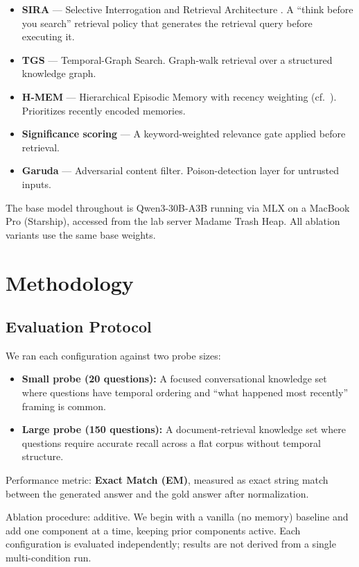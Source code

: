 \documentclass[11pt,a4paper]{article}
\begin{document}
\begin{itemize}
  \item \textbf{SIRA} --- Selective Interrogation and Retrieval Architecture \cite{sira}. A ``think before you search'' retrieval policy that generates the retrieval query before executing it.
  \item \textbf{TGS} --- Temporal-Graph Search. Graph-walk retrieval over a structured knowledge graph.
  \item \textbf{H-MEM} --- Hierarchical Episodic Memory with recency weighting (cf.~\cite{hipporag}). Prioritizes recently encoded memories.
  \item \textbf{Significance scoring} --- A keyword-weighted relevance gate applied before retrieval.
  \item \textbf{Garuda} --- Adversarial content filter. Poison-detection layer for untrusted inputs.
\end{itemize}

The base model throughout is Qwen3-30B-A3B \cite{qwen} running via MLX on a MacBook Pro (Starship), accessed from the lab server Madame Trash Heap. All ablation variants use the same base weights.

\section{Methodology}

\subsection{Evaluation Protocol}

We ran each configuration against two probe sizes:

\begin{itemize}
  \item \textbf{Small probe (20 questions):} A focused conversational knowledge set where questions have temporal ordering and ``what happened most recently'' framing is common.
  \item \textbf{Large probe (150 questions):} A document-retrieval knowledge set where questions require accurate recall across a flat corpus without temporal structure.
\end{itemize}

Performance metric: \textbf{Exact Match (EM)}, measured as exact string match between the generated answer and the gold answer after normalization.

Ablation procedure: additive. We begin with a vanilla (no memory) baseline and add one component at a time, keeping prior components active. Each configuration is evaluated independently; results are not derived from a single multi-condition run.
\end{document}

